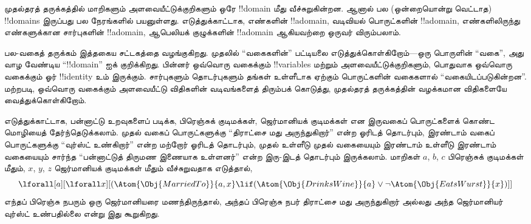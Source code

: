 \documentclass[../../../include/open-logic-section]{subfiles}
\begin{document}



முதல்தரத் தருக்கத்தில் மாறிகளும் அளவையீட்டுக்குறிகளும் ஒரே
!!{domain} மீது வீச்சுறுகின்றன. ஆனால் பல (ஒன்றையொன்று வெட்டாத)
!!{domain}s இருப்பது பல நேரங்களில் பயனுள்ளது. எடுத்துக்காட்டாக,
எண்களின் !!a{domain}, வடிவியல் பொருட்களின் !!a{domain}, எண்களிலிருந்து
எண்களுக்கான சார்புகளின் !!a{domain}, ஆபெலியக் குழுக்களின் !!a{domain}
ஆகியவற்றை ஒருவர் விரும்பலாம்.

பல-வகைத் தருக்கம் இத்தகைய சட்டகத்தை வழங்குகிறது. முதலில் ``வகைகளின்''
பட்டியலை எடுத்துக்கொள்கிறோம்---ஒரு பொருளின் ``வகை'', அது வாழ வேண்டிய
``!!{domain}'' ஐக் குறிக்கிறது. பின்னர் ஒவ்வொரு வகைக்கும்
!!{variable}s மற்றும் அளவையீட்டுக்குறிகளும், பொதுவாக ஒவ்வொரு வகைக்கும்
ஓர் !!{identity} உம் இருக்கும். சார்புகளும் தொடர்புகளும் தங்கள்
உள்ளீடாக ஏற்கும் பொருட்களின் வகைகளால் ``வகையிடப்படுகின்றன''. மற்றபடி,
ஒவ்வொரு வகைக்கும் அளவையீட்டு விதிகளின் வடிவங்களைத் திரும்பக் கொடுத்து,
முதல்தரத் தருக்கத்தின் வழக்கமான விதிகளையே வைத்துக்கொள்கிறோம்.

எடுத்துக்காட்டாக, பன்னாட்டு உறவுகளைப் படிக்க, பிரெஞ்சுக் குடிமக்கள்,
ஜெர்மானியக் குடிமக்கள் என இருவகைப் பொருட்களைக் கொண்ட மொழியைத்
தேர்ந்தெடுக்கலாம். முதல் வகைப் பொருட்களுக்கு ``திராட்சை மது அருந்துகிறார்''
என்ற ஓரிடத் தொடர்பும், இரண்டாம் வகைப் பொருட்களுக்கு ``வுர்ஸ்ட்
உண்கிறார்'' என்ற மற்றோர் ஓரிடத் தொடர்பும், முதல் உள்ளீடு முதல் வகையையும்
இரண்டாம் உள்ளீடு இரண்டாம் வகையையும் சார்ந்த ``பன்னாட்டுத் திருமண
இணையாக உள்ளனர்'' என்ற இரு-இடத் தொடர்பும் இருக்கலாம். மாறிகள் $a$, $b$,
$c$ பிரெஞ்சுக் குடிமக்கள் மீதும், $x$, $y$, $z$ ஜெர்மானியக் குடிமக்கள்
மீதும் வீச்சுறுவதாக எடுத்தால்,
\[
\lforall[a][\lforall x][(\Atom{\Obj{MarriedTo}}{a,x} \lif
(\Atom{\Obj{DrinksWine}}{a} \lor \lnot \Atom{\Obj{EatsWurst}}{x})]]
\]
எந்தப் பிரெஞ்சு நபரும் ஒரு ஜெர்மானியரை மணந்திருந்தால், அந்தப் பிரெஞ்சு
நபர் திராட்சை மது அருந்துகிறார் அல்லது அந்த ஜெர்மானியர் வுர்ஸ்ட்
உண்பதில்லை என்று இது கூறுகிறது.
\end{document}
